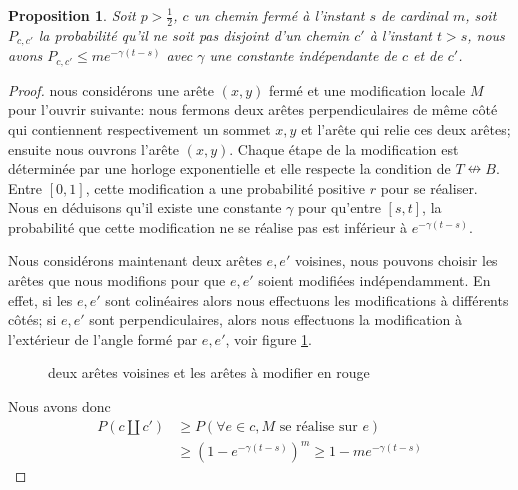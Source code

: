 \documentclass[titlepage,a4paper,12pt]{article}
\newcounter{prop}
\newtheorem{decexp}[prop]{Proposition}
\newcommand{\nconnect}{\nleftrightarrow}
\begin{document}
\begin{decexp}
Soit $p>\frac{1}{2}$, $c$ un chemin fermé à l'instant $s$ de cardinal $m$, soit $P_{c,c'}$ la probabilité qu'il ne soit pas disjoint d'un chemin $c'$ à l'instant $t>s$, nous avons $P_{c,c'}\leqslant me^{-\gamma(t-s)}$ avec $\gamma$ une constante indépendante de $c$ et de $c'$.
\end{decexp}
\begin{proof}
nous considérons une arête $(x,y)$ fermé et une modification locale $M$ pour l'ouvrir suivante: nous fermons deux arêtes perpendiculaires de même côté qui contiennent respectivement un sommet $x,y$ et l'arête qui relie ces deux arêtes; ensuite nous ouvrons l'arête $(x,y)$. Chaque étape de la modification est déterminée par une horloge exponentielle et elle respecte la condition de $T\nconnect B$. Entre $[0,1]$, cette modification a une probabilité positive $r$ pour se réaliser. Nous en déduisons qu'il existe une constante $\gamma$ pour qu'entre $[s,t]$, la probabilité que cette modification ne se réalise pas est inférieur à $e^{-\gamma(t-s)}$. 

Nous considérons maintenant deux arêtes $e,e'$ voisines, nous pouvons choisir les arêtes que nous modifions pour que $e,e'$ soient modifiées indépendamment. En effet, si les $e,e'$ sont colinéaires alors nous effectuons les modifications à différents côtés; si $e,e'$ sont perpendiculaires, alors nous effectuons la modification à l'extérieur de l'angle formé par $e,e'$, voir figure \ref{fig:mod}.

\begin{figure}[h]

\begin{minipage}{0.45\linewidth}
\center
{}
\end{minipage}
\hfill
\begin{minipage}{0.45\linewidth}
\center
{}
\end{minipage}
\caption{deux arêtes voisines et les arêtes à modifier en rouge}
\label{fig:mod}

\end{figure}

Nous avons donc 
\begin{align*}
 P(c \coprod c') &\geqslant P(\forall e \in c, M \text{ se réalise sur } e) \\
 & \geqslant (1-e^{-\gamma (t-s)})^m \geqslant 1-me^{-\gamma (t-s)}
\end{align*} 
\end{proof}
\end{document}
